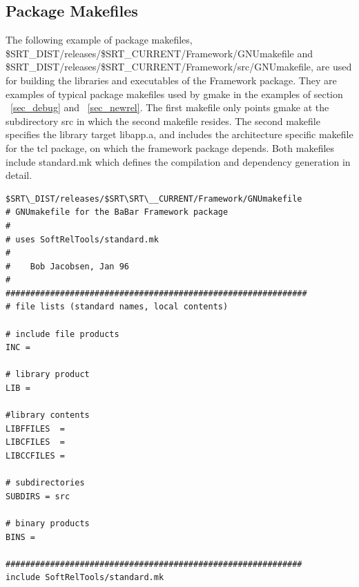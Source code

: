 \subsection{Package Makefiles}
\label{app_package_make}
The following example of package makefiles, \\
\$SRT\_DIST/releases/\$SRT\_CURRENT/Framework/GNUmakefile 
and \\ \$SRT\_DIST/releases/\$SRT\_CURRENT/Framework/src/GNUmakefile, 
are used for building the libraries and executables of the Framework package.
They are examples of typical package makefiles used by gmake in the examples of 
section ~\ref{sec_debug} and ~\ref{sec_newrel}. 
The first makefile only points gmake at the subdirectory src in which the
second makefile resides. The second makefile specifies the library target 
libapp.a, and includes the architecture specific makefile for the tcl package, 
on which the framework package depends.  Both makefiles include standard.mk 
which defines the compilation and dependency generation in detail.
\begin{footnotesize}
\begin{verbatim}
$SRT\_DIST/releases/$SRT\SRT\__CURRENT/Framework/GNUmakefile 
# GNUmakefile for the BaBar Framework package
#
# uses SoftRelTools/standard.mk
#
#    Bob Jacobsen, Jan 96
#
#############################################################
# file lists (standard names, local contents)

# include file products
INC =

# library product
LIB =

#library contents
LIBFFILES  =
LIBCFILES  =
LIBCCFILES =

# subdirectories
SUBDIRS = src

# binary products
BINS =

############################################################
include SoftRelTools/standard.mk
\end{verbatim}
\end{footnotesize}
\vspace*{1in}
